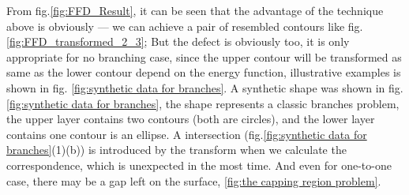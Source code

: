 \documentclass[3p,times]{elsarticle}
\begin{document}
From fig.\ref{fig:FFD_Result}, it can be seen that the advantage of
the technique above is obviously --- we can achieve a pair of resembled contours like
fig.\ref{fig:FFD_transformed_2_3}; But the defect is obviously too, it is
only appropriate for no branching case, since the upper contour will
be transformed as same as the lower contour depend on the energy
function, illustrative examples is shown in fig. \ref{fig:synthetic data for branches}. A synthetic shape was shown in
fig.\ref{fig:synthetic data for branches}, the shape represents a
classic branches problem, the upper layer contains two contours (both
are circles), and the lower layer contains one contour is an
ellipse. A intersection (fig.\ref{fig:synthetic data for branches}(1)(b)) is
introduced by the transform when we calculate the correspondence,
which is unexpected in the most time. And even for one-to-one case,
there may be a gap left on the surface, \ref{fig:the capping region
  problem}.
\end{document}
